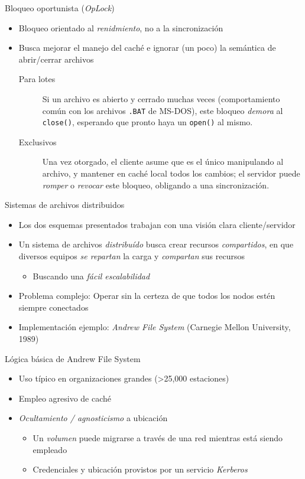 \documentclass[presentation]{beamer}
\begin{document}
\begin{frame}[label={sec:org1833b52},fragile]{Bloqueo oportunista (\emph{OpLock})}
 \begin{itemize}
\item Bloqueo orientado al \emph{renidmiento}, no a la sincronización
\item Busca mejorar el manejo del caché e ignorar (un poco) la semántica
de abrir/cerrar archivos
\begin{description}
\item[{Para lotes}] Si un archivo es abierto y cerrado muchas veces
(comportamiento común con los archivos \texttt{.BAT} de
MS-DOS), este bloqueo \emph{demora} al \texttt{close()},
esperando que pronto haya un \texttt{open()} al mismo.
\item[{Exclusivos}] Una vez otorgado, el cliente asume que es el único
manipulando al archivo, y mantener en caché local
todos los cambios; el servidor puede \emph{romper} o
\emph{revocar} este bloqueo, obligando a una
sincronización.
\end{description}
\end{itemize}
\end{frame}

\begin{frame}[label={sec:orgdaf8050}]{Sistemas de archivos distribuidos}
\begin{itemize}
\item Los dos esquemas presentados trabajan con una visión clara
cliente/servidor
\item Un sistema de archivos \emph{distribuído} busca crear recursos
\emph{compartidos}, en que diversos equipos \emph{se repartan} la carga y
\emph{compartan} sus recursos
\begin{itemize}
\item Buscando una \emph{fácil escalabilidad}
\end{itemize}
\item Problema complejo: Operar sin la certeza de que todos los nodos
estén siempre conectados
\item Implementación ejemplo: \emph{Andrew File System} (Carnegie Mellon
University, 1989)
\end{itemize}
\end{frame}

\begin{frame}[label={sec:org42c1ee2}]{Lógica básica de Andrew File System}
\begin{itemize}
\item Uso típico en organizaciones grandes (>25,000 estaciones)
\item Empleo agresivo de caché
\item \emph{Ocultamiento / agnosticismo} a ubicación
\begin{itemize}
\item Un \emph{volumen} puede migrarse a través de una red mientras está
siendo empleado
\item Credenciales y ubicación provistos por un servicio \emph{Kerberos}
\end{itemize}
\end{itemize}
\end{frame}
\end{document}
